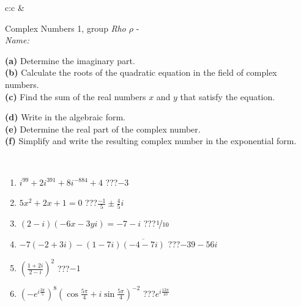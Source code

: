 \documentclass[10pt]{report}
\begin{document}
\begin{tabular}{c:c}
&
\begin{minipage}[c][104.5mm][t]{0.5\linewidth}
\begin{center}
\vspace{5mm}
{\huge Complex Numbers 1, group \textit{Rho $\rho$} -}\\[5mm]
\textit{Name:}\phantom{xxxxxxxxxxxxxxxxxxxxxxxxxxxxxxxxxxxxxxxxxxxxxxxxxxxxxxxxxxxxxxxxx}\\[5mm]
\begin{minipage}{0.95\linewidth}
\begin{center}
{\small \begin{minipage}{0.44\textwidth} \raggedright
\textbf{(a)} Determine the imaginary part. \\[1mm]
\textbf{(b)} Calculate the roots of the quadratic equation in the field of complex numbers. \\[1mm]
\textbf{(c)} Find the sum of the real numbers \(x\) and \(y\) that satisfy the equation. \end{minipage} \begin{minipage}{0.54\textwidth}
\textbf{(d)} Write in the algebraic form. \\[1mm]
\textbf{(e)} Determine the real part of the complex number. \\[1mm]
\textbf{(f)} Simplify and write the resulting complex number in the exponential form.
\end{minipage}
} \vspace{3mm}
\end{center}
\end{minipage}
\\[1mm]
\begin{minipage}{0.79\linewidth}
\begin{center}
\begin{varwidth}{\linewidth}
\setlength{\itemsep}{0pt}
\begin{enumerate}
\large
\item $i^{99}+2i^{391}+8i^{-884}+4$\quad \dotfill\; ???\;\dotfill \quad $-3$
\item $5x^2+2x+1=0$\quad \dotfill\; ???\;\dotfill \quad $\frac{-1}{5} \pm{}\frac{4}{5}i$
\item $(2-i)(-6x-3yi)=-7-i$\quad \dotfill\; ???\;\dotfill \quad $\nicefrac{1}{10}$
\item $-7(-2+3i)-(1-7i)\overline{(-4-7i)}$\quad \dotfill\; ???\;\dotfill \quad $-39-56i$
\item $\left(\frac{1+2i}{2-i}\right)^2$\quad \dotfill\; ???\;\dotfill \quad $-1$
\item $\left(-e^{i\frac{3\pi}{5}}\right)^{8}\left(\cos{\frac{5\pi}{4}}+i\sin{\frac{5\pi}{4}}\right)^{-2}$\quad \dotfill\; ???\;\dotfill \quad $e^{i\frac{13\pi}{10}}$

\end{enumerate}
\end{varwidth}
\end{center}
\end{minipage}
\end{center}
\end{minipage}
\end{tabular}
\end{document}
